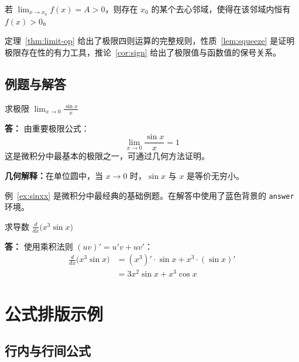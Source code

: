 \documentclass{harryopo-mathnotes}
\begin{document}
\begin{formal}
\begin{corollary}[极限的保号性]\label{cor:sign}
若 $\displaystyle\lim_{x\to x_0}f(x)=A>0$，则存在 $x_0$ 的某个去心邻域，使得在该邻域内恒有 $f(x)>0$。
\end{corollary}
\end{formal}

定理~\ref{thm:limit-op} 给出了极限四则运算的完整规则，性质~\ref{lem:squeeze} 是证明极限存在性的有力工具，推论~\ref{cor:sign} 给出了极限值与函数值的保号关系。

\subsection{例题与解答}

\begin{example}\label{ex:sinxx}
  求极限 $\displaystyle\lim_{x\to 0}\frac{\sin x}{x}$
\end{example}
\begin{answer}
  \textbf{答：}
  {\fzkt 由重要极限公式：
  $$\lim_{x\to 0}\frac{\sin x}{x}=1$$
  这是微积分中最基本的极限之一，可通过几何方法证明。}

  \textbf{几何解释：}在单位圆中，当 $x\to 0$ 时，$\sin x$ 与 $x$ 是等价无穷小。
\end{answer}

例~\ref{ex:sinxx} 是微积分中最经典的基础例题。在解答中使用了蓝色背景的 \texttt{answer} 环境。

\begin{example}
  求导数 $\displaystyle\frac{d}{dx}\bigl(x^3\sin x\bigr)$
\end{example}
\begin{answer}
  \textbf{答：}
  {\fzkt 使用乘积法则 $(uv)'=u'v+uv'$：
  \begin{align*}
    \frac{d}{dx}\bigl(x^3\sin x\bigr)
    &= (x^3)'\cdot\sin x + x^3\cdot(\sin x)' \\
    &= 3x^2\sin x + x^3\cos x
  \end{align*}}
\end{answer}

\section{公式排版示例}

\subsection{行内与行间公式}
\end{document}
